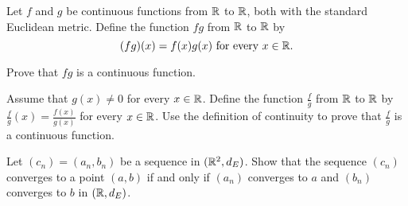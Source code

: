 \item Let $f$ and $g$ be continuous functions from $\mathbb{R}$ to $\mathbb{R}$, both with the standard Euclidean metric. Define the function $fg$ from $\mathbb{R}$ to $\mathbb{R}$ by 
\[(fg)(x) = f(x)g(x) \text{ for every } x \in \mathbb{R}.\]
	\ba
	\item Prove that $fg$ is a continuous function.
	
	\item Assume that $g(x) \neq 0$ for every $x \in \mathbb{R}$. Define the function $\frac{f}{g}$ from $\mathbb{R}$ to $\mathbb{R}$ by $\frac{f}{g}(x) = \frac{f(x)}{g(x)}$ for every $x \in \mathbb{R}$. Use the definition of continuity to prove that $\frac{f}{g}$ is a continuous function.
	
	\ea
	
\begin{comment}

\ExerciseSolution

\ba
\item Let $a \in \R$. Let $(a_n)$ be a sequence in $\R$ that converges to $a$. Since $f$ and $g$ are continuous at $a$, we know that $\lim f(a_n) = f(a)$ and $\lim g(a_n) = g(a)$. We use the result of Exercise \ref{ex:limit_properties} on the sequences $(f(a_n))$ and $(g(a_n))$. to see that 
\[\lim (fg)(a_n) = \lim f(a_n)g(a_n) = \lim f(a_n) \lim g(a_n) = f(a) g(a).\]
So $fg$ is continuous at $a$. 

\item Similar to part (a) we have 
\[\lim \left(\frac{f}{g}\right)(a_n) = \lim \frac{f(a_n)}{g(a_n)} = \frac{\lim f(a_n)}{ \lim g(a_n)} = \frac{f(a)}{g(a)}.\]
So $\frac{f}{g}$ is continuous at $a$. 

\ea

\end{comment}

\item Let $(c_n) = (a_n,b_n)$ be a sequence in $(\mathbb{R}^2, d_E)$. Show that the sequence $(c_n)$ converges to a point $(a,b)$ if and only if $(a_n)$ converges to $a$ and $(b_n)$ converges to $b$ in $(\mathbb{R}, d_E)$. 

